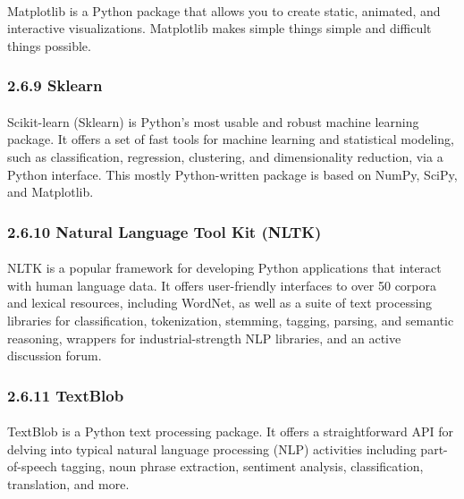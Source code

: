 \documentclass[runningheads]{llncs}
\begin{document}
\paragraph{}
Matplotlib is a Python package that allows you to create static, animated, and interactive visualizations. Matplotlib makes simple things simple and difficult things possible.

\subsubsection{2.6.9 Sklearn}
\paragraph{}
Scikit-learn (Sklearn) is Python's most usable and robust machine learning package. It offers a set of fast tools for machine learning and statistical modeling, such as classification, regression, clustering, and dimensionality reduction, via a Python interface. This mostly Python-written package is based on NumPy, SciPy, and Matplotlib.

\subsubsection{2.6.10 Natural Language Tool Kit (NLTK)}
\paragraph{}
NLTK is a popular framework for developing Python applications that interact with human language data. It offers user-friendly interfaces to over 50 corpora and lexical resources, including WordNet, as well as a suite of text processing libraries for classification, tokenization, stemming, tagging, parsing, and semantic reasoning, wrappers for industrial-strength NLP libraries, and an active discussion forum.

\subsubsection{2.6.11 TextBlob}
\paragraph{}
TextBlob is a Python text processing package. It offers a straightforward API for delving into typical natural language processing (NLP) activities including part-of-speech tagging, noun phrase extraction, sentiment analysis, classification, translation, and more.
\end{document}
